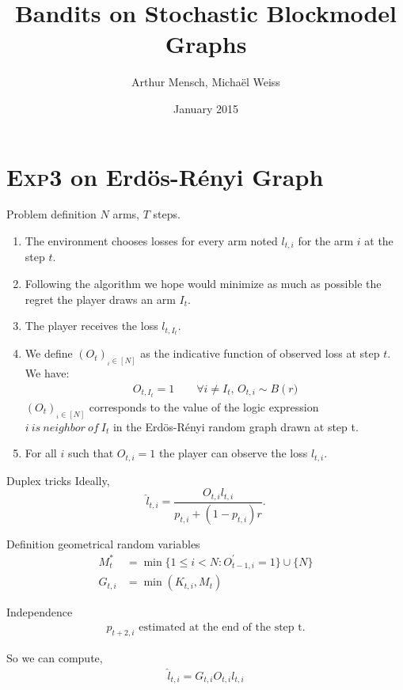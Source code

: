 \documentclass[11pt]{beamer}
\author{Arthur Mensch, Michaël Weiss}
\title{Bandits on Stochastic Blockmodel Graphs}
\institute{Reinforcement Learning}
\date{January 2015}
\begin{document}
\begin{frame}
\titlepage
\end{frame}

\section{\textsc{Exp3} on Erdös-Rényi Graph}
\begin{frame}{Problem definition}
$N$ arms, $T$ steps.
\begin{enumerate}
\item The environment chooses losses for every arm noted $l_{t,i}$ for the arm $i$ at the step $t$.
\item Following the algorithm we hope would minimize as much as possible the regret the player draws an arm $I_t$.
\item The player receives the loss $l_{t,I_t}$.
\item We define $\left(O_t\right)_{_i\in\left[N\right]}$ as the indicative function of observed loss at step $t$. We have:
\begin{align*}
O_{t,I_t}=1 \qquad \forall i \neq I_t,\, O_{t,i} \sim B\left(r\right.)
\end{align*}
$\left(O_t\right)_{_i\in\left[N\right]}$ corresponds to the value of the logic expression $ i \ is\ neighbor\ of\ I_t$ in the Erdös-Rényi random graph drawn at step t.
\item For all $i$ such that $O_{t,i}=1$ the player can observe the loss $l_{t,i}$.
\end{enumerate}
\end{frame}

\begin{frame}{Duplex tricks}
Ideally,
\[
\hat{l}_{t,i}=\frac{O_{t,i}l_{t,i}}{p_{t,i} + (1-p_{t,i})r}.
\]
\begin{block}{Definition geometrical random variables}
\begin{align*}
M_t^* &=\min\{1\leq i<N: O_{t-1,i}^{'} =1\}\cup\{N\}\\
G_{t,i}&=\min\left(K_{t,i},M_t\right)
\end{align*}
\end{block}
\begin{block}{Independence}
\begin{align*}
p_{t+2,i} \text{ estimated at the end of the step t.}
\end{align*}
\end{block}
So we can compute,
\begin{align*}
\hat{l}_{t,i}=G_{t,i}O_{t,i}l_{t,i}
\end{align*}
\end{frame}
\end{document}
